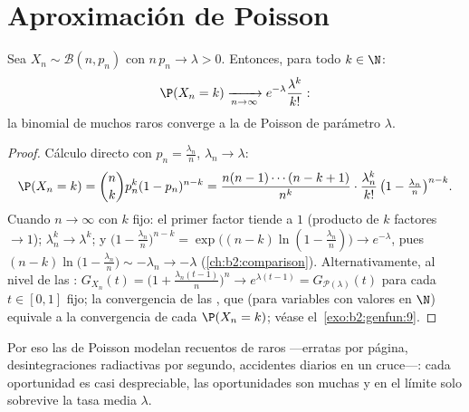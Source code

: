 \section{Aproximación de Poisson}

\begin{theorem}\label{thm:b2:genfun:rareevents}
Sea $X_n \sim \mathcal{B}(n, p_n)$ con $n\,p_n \to \lambda > 0$.
Entonces, para todo $k \in \N$:
\[
\P(X_n = k)
\xrightarrow[n\to\infty]{}
e^{-\lambda}\frac{\lambda^k}{k!} :
\]
la  binomial de muchos  raros converge a la
 de Poisson de parámetro $\lambda$.
\end{theorem}

\begin{proof}
Cálculo directo con $p_n = \frac{\lambda_n}{n}$, $\lambda_n \to
\lambda$:
\[
\P(X_n = k)
= \binom nk p_n^k(1 - p_n)^{n-k}
= \frac{n(n-1)\cdots(n-k+1)}{n^k}\cdot
\frac{\lambda_n^k}{k!}\,
\bigl(1 - \tfrac{\lambda_n}{n}\bigr)^{n-k} .
\]
Cuando $n \to \infty$ con $k$ fijo: el primer factor tiende a $1$
(producto de $k$ factores $\to 1$); $\lambda_n^k \to \lambda^k$; y
$\bigl(1 - \frac{\lambda_n}{n}\bigr)^{n-k} = \exp\bigl((n-k)\ln(1 -
\frac{\lambda_n}{n})\bigr) \to e^{-\lambda}$, pues $(n - k)\ln\bigl(1
- \frac{\lambda_n}{n}\bigr) \sim -\lambda_n \to -\lambda$
(\cref{ch:b2:comparison}). Alternativamente, al nivel de las
: $G_{X_n}(t) = \bigl(1 +
\frac{\lambda_n(t-1)}{n}\bigr)^n \to e^{\lambda(t - 1)} =
G_{\mathcal{P}(\lambda)}(t)$ para cada $t \in [0, 1]$ fijo; la
convergencia de las , que (para variables con
valores en $\N$) equivale a la convergencia de cada $\P(X_n = k)$;
véase el~\cref{exo:b2:genfun:9}.
\end{proof}

\begin{remark}
Por eso las  de Poisson modelan recuentos de  raros
---erratas por página, desintegraciones radiactivas por segundo,
accidentes diarios en un cruce---: cada oportunidad es casi
despreciable, las oportunidades son muchas y en el límite solo
sobrevive la tasa media $\lambda$.
\end{remark}

